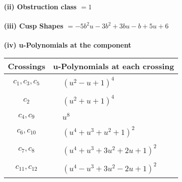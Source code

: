 \documentclass[1p]{elsarticle_modified}
\theoremstyle{definition}
\begin{document}
\flushleft \textbf{(ii) Obstruction class $= 1$}\\~\\
\flushleft \textbf{(iii) Cusp Shapes $= -5 b^2 u-3 b^2+3 b u- b+5 u+6$}\\~\\
\newpage\renewcommand{\arraystretch}{1}
\flushleft \textbf{(iv) u-Polynomials at the component}\newline \\
\begin{tabular}{m{50pt}|m{274pt}}
Crossings & \hspace{64pt}u-Polynomials at each crossing \\
\hline $$\begin{aligned}c_{1},c_{3},c_{5}\end{aligned}$$&$\begin{aligned}
&(u^2- u+1)^4
\end{aligned}$\\
\hline $$\begin{aligned}c_{2}\end{aligned}$$&$\begin{aligned}
&(u^2+u+1)^4
\end{aligned}$\\
\hline $$\begin{aligned}c_{4},c_{9}\end{aligned}$$&$\begin{aligned}
&u^8
\end{aligned}$\\
\hline $$\begin{aligned}c_{6},c_{10}\end{aligned}$$&$\begin{aligned}
&(u^4+u^3+u^2+1)^2
\end{aligned}$\\
\hline $$\begin{aligned}c_{7},c_{8}\end{aligned}$$&$\begin{aligned}
&(u^4+u^3+3 u^2+2 u+1)^2
\end{aligned}$\\
\hline $$\begin{aligned}c_{11},c_{12}\end{aligned}$$&$\begin{aligned}
&(u^4- u^3+3 u^2-2 u+1)^2
\end{aligned}$\\
\hline
\end{tabular}\\~\\
\end{document}
